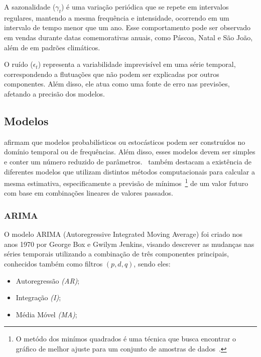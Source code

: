         A sazonalidade ($\gamma_t$) é uma variação periódica que se repete em intervalos regulares, mantendo a mesma frequência e 
        intensidade, ocorrendo em um intervalo de tempo menor que um ano. Esse comportamento pode ser observado em 
        vendas durante datas comemorativas anuais, como Páscoa, Natal e São João, além de em padrões climáticos.
        
        O ruído ($\epsilon_t$) representa a variabilidade imprevisível em uma série temporal, correspondendo a flutuações que não 
        podem ser explicadas por outros componentes. Além disso, ele atua como uma fonte de erro nas previsões, afetando a precisão 
        dos modelos.


    \subsection{Modelos}
         afirmam que modelos probabilísticos ou estocásticos podem ser construídos no 
        domínio temporal ou de frequências. Além disso, esses modelos devem ser simples e conter um número 
        reduzido de parâmetros.~ também destacam a existência de diferentes modelos 
        que utilizam distintos métodos computacionais para calcular a mesma estimativa, especificamente a 
        previsão de mínimos~\footnote{O metódo dos minímos quadrados é uma técnica que busca encontrar o 
        gráfico de melhor ajuste para um conjunto de amostras de dados~\cite{miyasaki2010}.} de um valor 
        futuro com base em combinações lineares de valores passados.

        \subsubsection{ARIMA}
            O modelo ARIMA (Autoregressive Integrated Moving Average) foi criado nos anos 1970 por George Box
            e Gwilym Jenkins, visando descrever as mudanças nas séries temporais utilizando a combinação de três
            componentes principais, conhecidos também como filtros \((p, d, q)\), sendo eles:
            \begin{itemize}
                \item Autoregressão \emph{(AR)};
                \item Integração \emph{(I)};
                \item Média Móvel \emph{(MA)};
            \end{itemize}

